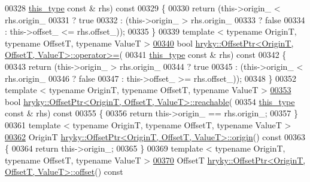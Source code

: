 \begin{DoxyCode}
00328     \hyperlink{classhryky_1_1_offset_ptr}{this_type} \textcolor{keyword}{const} & rhs)\textcolor{keyword}{ const}
00329 \textcolor{keyword}{}\{
00330     \textcolor{keywordflow}{return} (this->origin\_ < rhs.origin\_
00331             ? \textcolor{keyword}{true}
00332             : (this->origin\_ > rhs.origin\_
00333                ? \textcolor{keyword}{false}
00334                : this->offset\_ <= rhs.offset\_));
00335 \}
00339 \textcolor{keyword}{template} < \textcolor{keyword}{typename} OriginT, \textcolor{keyword}{typename} OffsetT, \textcolor{keyword}{typename} ValueT >
\hypertarget{offset__ptr_8h_source_l00340}{}\hyperlink{classhryky_1_1_offset_ptr_adbd465e4e0a04117512a034b97cbc392}{00340} \textcolor{keywordtype}{bool} \hyperlink{namespacehryky_acc487ba69503ce030df6f4b9db4cbe8b}{hryky::OffsetPtr<OriginT, OffsetT, ValueT>::operator>=}(
00341     \hyperlink{classhryky_1_1_offset_ptr}{this_type} \textcolor{keyword}{const} & rhs)\textcolor{keyword}{ const}
00342 \textcolor{keyword}{}\{
00343     \textcolor{keywordflow}{return} (this->origin\_ > rhs.origin\_
00344             ? \textcolor{keyword}{true}
00345             : (this->origin\_ < rhs.origin\_
00346                ? \textcolor{keyword}{false}
00347                : this->offset\_ >= rhs.offset\_));
00348 \}
00352 \textcolor{keyword}{template} < \textcolor{keyword}{typename} OriginT, \textcolor{keyword}{typename} OffsetT, \textcolor{keyword}{typename} ValueT >
\hypertarget{offset__ptr_8h_source_l00353}{}\hyperlink{classhryky_1_1_offset_ptr_a1296e4d0a123134cfa2fa44405c91ab3}{00353} \textcolor{keywordtype}{bool} \hyperlink{classhryky_1_1_offset_ptr}{hryky::OffsetPtr<OriginT, OffsetT, ValueT>::reachable}(
00354     \hyperlink{classhryky_1_1_offset_ptr}{this_type} \textcolor{keyword}{const} & rhs)\textcolor{keyword}{ const}
00355 \textcolor{keyword}{}\{
00356     \textcolor{keywordflow}{return} this->origin\_ == rhs.origin\_;
00357 \}
00361 \textcolor{keyword}{template} < \textcolor{keyword}{typename} OriginT, \textcolor{keyword}{typename} OffsetT, \textcolor{keyword}{typename} ValueT >
\hypertarget{offset__ptr_8h_source_l00362}{}\hyperlink{classhryky_1_1_offset_ptr_af74f8eb3403a971a16440c7e1e164cbe}{00362} OriginT \hyperlink{classhryky_1_1_offset_ptr}{hryky::OffsetPtr<OriginT, OffsetT, ValueT>::origin}()\textcolor{keyword}{ const}
00363 \textcolor{keyword}{}\{
00364     \textcolor{keywordflow}{return} this->origin\_;
00365 \}
00369 \textcolor{keyword}{template} < \textcolor{keyword}{typename} OriginT, \textcolor{keyword}{typename} OffsetT, \textcolor{keyword}{typename} ValueT >
\hypertarget{offset__ptr_8h_source_l00370}{}\hyperlink{classhryky_1_1_offset_ptr_ada822ff23d086dda31c0d4c1f6c9ebd5}{00370} OffsetT \hyperlink{classhryky_1_1_offset_ptr}{hryky::OffsetPtr<OriginT, OffsetT, ValueT>::offset}()\textcolor{keyword}{ const}

\end{DoxyCode}

